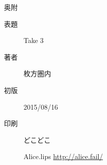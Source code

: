 
\vspace*{150mm}

\begin{flushright}
\begin{minipage}{70mm}
\begin{itembox}{ 奥附 }
  \begin{description}
    \item[表題] Take 3
    \item[著者] 枚方圏内
    \item[初版] 2015/08/16
    \item[印刷] どこどこ
    \item[] \hspace*{-10pt} Alice.lips \url{http://alice.fail/}
  \end{description}
\end{itembox}
\end{minipage}
\end{flushright}
